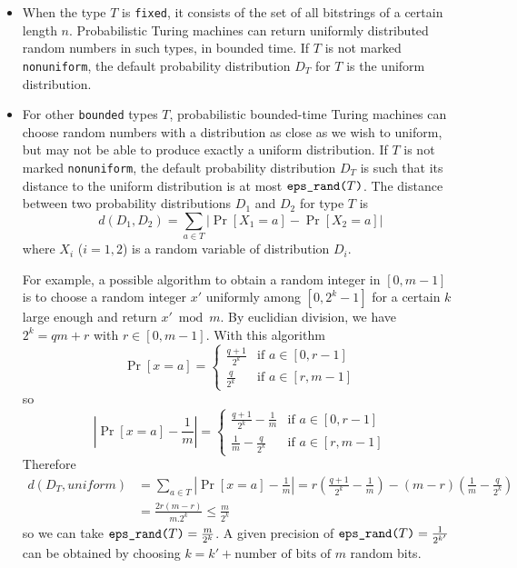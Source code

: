\begin{itemize}
\begin{itemize}
\item When the type $T$ is {\tt fixed}, it consists of the set of all 
bitstrings of a certain length $n$.  Probabilistic Turing machines can
return uniformly distributed random numbers in such types, in bounded
time.
If $T$ is not marked {\tt nonuniform}, the default probability 
distribution $D_T$ for $T$ is the uniform distribution.

\item For other {\tt bounded} types $T$, probabilistic bounded-time Turing 
machines can choose random numbers with a distribution as close as we
wish to uniform, but may not be able to produce exactly a uniform
distribution. If $T$ is not marked {\tt nonuniform}, 
the default probability distribution $D_T$ is such that its distance
to the uniform distribution is at most $\texttt{eps\_rand(}T\texttt{)}$. The distance between
two probability distributions $D_1$ and $D_2$ for type $T$ is
\[d(D_1, D_2) = \sum_{a \in T} | \Pr[X_1 = a] - \Pr[X_2 = a] |\]
where $X_i$ ($i = 1, 2$) is a random variable of distribution $D_i$.

For example, a possible algorithm to obtain a random integer in $[0,
m-1]$ is to choose a random integer $x'$ uniformly among $[0, 2^k-1]$
for a certain $k$ large enough and return $x' \bmod m$. 
By euclidian division, we have $2^k = qm+r$ with $r \in [0,m-1]$.
With this algorithm
\[\Pr[x = a] = \begin{cases}
\frac{q+1}{2^k} &\text{if }a \in [0,r-1]\\
\frac{q}{2^k} &\text{if }a \in [r,m-1]
\end{cases}\]
so
\[\left|\Pr[x = a] -\frac{1}{m}\right| = \begin{cases}
\frac{q+1}{2^k} - \frac{1}{m}&\text{if }a \in [0,r-1]\\
\frac{1}{m} - \frac{q}{2^k}&\text{if }a \in [r,m-1]
\end{cases}\]
Therefore
\[\begin{split}
d(D_T, \mathit{uniform}) 
&=  \sum_{a \in T} \left| \Pr[x = a] - \frac{1}{m} \right|
= r\left(\frac{q+1}{2^k} - \frac{1}{m}\right) - (m-r)\left(\frac{1}{m} - \frac{q}{2^k}\right)\\
&=\frac{2r(m-r)}{m.2^k} \leq \frac{m}{2^k}
\end{split}\]
so we can take $\texttt{eps\_rand(}T\texttt{)} = \frac{m}{2^k}$. A given precision of $\texttt{eps\_rand(}T\texttt{)} = \frac{1}{2^{k'}}$ can be obtained by choosing $k = k' + \text{number of bits of }m$ random bits.


\end{itemize}
\end{itemize}
